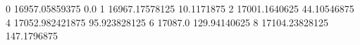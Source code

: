 0 16957.05859375 0.0
1 16967.17578125 10.1171875
2 17001.1640625 44.10546875
4 17052.982421875 95.923828125
6 17087.0 129.94140625
8 17104.23828125 147.1796875
